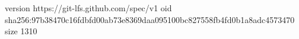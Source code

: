 version https://git-lfs.github.com/spec/v1
oid sha256:97b38470c16fdbfd00ab73e8369daa095100bc827558fb4fd0b1a8adc4573470
size 1310
